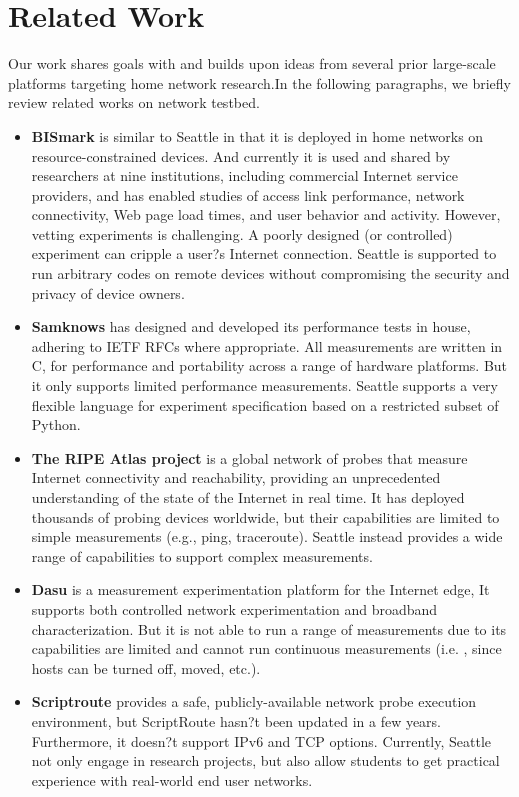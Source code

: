 \section{Related Work}
\label{sec.related_work}
Our work shares goals with and builds upon ideas from several prior large-scale platforms targeting home network research.In the following paragraphs, we briefly review related works on network testbed. 
\begin{itemize}
\item \textbf{BISmark} is similar to Seattle in that it is deployed in home networks on resource-constrained devices. And currently it is used and shared by researchers at nine institutions, including commercial Internet service providers, and has enabled studies of access link performance, network connectivity, Web page load times, and user behavior and activity. However, vetting experiments is challenging. A poorly designed (or controlled) experiment can cripple a user?s Internet connection. Seattle is supported to run arbitrary codes on remote devices without compromising the security and privacy of device owners.
\item \textbf{Samknows} has designed and developed its performance tests in house, adhering to IETF RFCs where appropriate. All measurements are written in C, for performance and portability across a range of hardware platforms. But it only supports limited performance measurements. Seattle supports a very flexible language for experiment specification based on a restricted subset of Python.
\item \textbf{The RIPE Atlas project} is a global network of probes that measure Internet connectivity and reachability, providing an unprecedented understanding of the state of the Internet in real time. It has deployed thousands of probing devices worldwide, but their capabilities are limited to simple measurements (e.g., ping, traceroute). Seattle instead provides a wide range of capabilities to support complex measurements. 
\item \textbf{Dasu} is a measurement experimentation platform for the Internet edge, It supports both controlled network experimentation and broadband characterization. But it is not able to run a range of  measurements due to its capabilities are limited and cannot run continuous measurements (i.e. , since hosts can be turned off, moved, etc.).
\item \textbf{Scriptroute} provides a safe, publicly-available network probe execution environment, but ScriptRoute hasn?t been updated in a few years. Furthermore, it doesn?t support IPv6 and TCP options. Currently, Seattle not only engage in research projects, but also  allow students to get practical experience with real-world end user networks.


\end{itemize}
